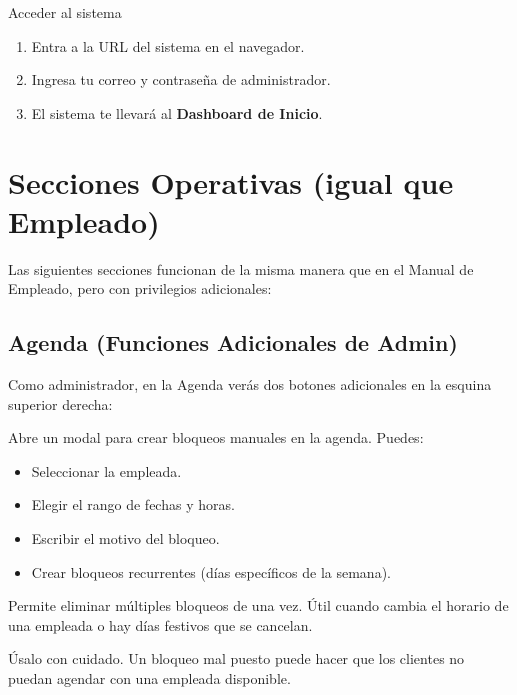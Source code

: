 \documentclass[12pt,a4paper]{article}
\begin{document}
\begin{pasobox}{Acceder al sistema}
\begin{enumerate}[leftmargin=*]
  \item Entra a la URL del sistema en el navegador.
  \item Ingresa tu correo y contraseña de administrador.
  \item El sistema te llevará al \textbf{Dashboard de Inicio}.
\end{enumerate}
\end{pasobox}

\section{Secciones Operativas (igual que Empleado)}

Las siguientes secciones funcionan de la misma manera que en el Manual de Empleado, pero con privilegios adicionales:

\subsection{Agenda (Funciones Adicionales de Admin)}

Como administrador, en la Agenda verás dos botones adicionales en la esquina superior derecha:

\begin{description}[leftmargin=0pt]
  \item[\textbf{Bloquear Horario:}] Abre un modal para crear bloqueos manuales en la agenda. Puedes:
    \begin{itemize}
      \item Seleccionar la empleada.
      \item Elegir el rango de fechas y horas.
      \item Escribir el motivo del bloqueo.
      \item Crear bloqueos recurrentes (días específicos de la semana).
    \end{itemize}
  \item[\textbf{Desbloqueo Masivo:}] Permite eliminar múltiples bloqueos de una vez. Útil cuando cambia el horario de una empleada o hay días festivos que se cancelan.
\end{description}

\begin{alertabox}
Úsalo con cuidado. Un bloqueo mal puesto puede hacer que los clientes no puedan agendar con una empleada disponible.
\end{alertabox}
\end{document}
